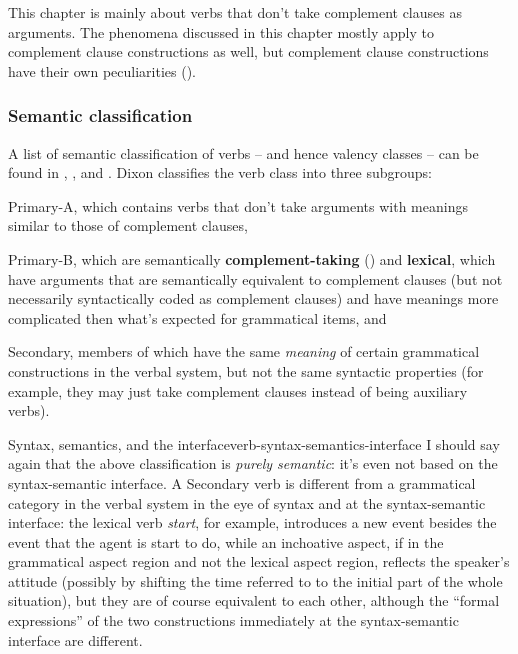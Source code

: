 \documentclass[a4paper, oneside]{report}
\newcommand*{\citesec}[1]{\S~{#1}}
\newcommand*{\concept}[1]{\textbf{#1}}
\newcommand{\corpus}[1]{\emph{#1}}
\begin{document}
This chapter is mainly about verbs that don't take complement clauses as arguments.
The phenomena discussed in this chapter mostly apply to complement clause constructions as well,
but complement clause constructions have their own peculiarities 
().

\subsubsection{Semantic classification}\label{sec:verb-valency.overview.semantic}

A list of semantic classification of verbs -- 
and hence valency classes -- can be found in 
\citet[Part B]{dixon2005semantic},
\citet[\citesec{18.5}]{dixon2010basic2},
and \citet[\citesec{3.3}]{dixon2009basic1}.
Dixon classifies the verb class into three subgroups:
\begin{enumerate*}
    \item Primary-A, which contains verbs that 
    don't take arguments with meanings similar to those of complement clauses,
    \item Primary-B, which are semantically \concept{complement-taking} () 
    and \concept{lexical},
    which have arguments that are semantically equivalent to complement clauses 
    (but not necessarily syntactically coded as complement clauses)
    and have meanings more complicated then what's expected for grammatical items, and 
    \item Secondary, members of which have the same \emph{meaning} 
    of certain grammatical constructions in the verbal system,
    but not the same syntactic properties
    (for example, they may just take complement clauses instead of being auxiliary verbs).
\end{enumerate*}

\begin{infobox}{Syntax, semantics, and the interface}{verb-syntax-semantics-interface}
    I should say again that the above classification is \emph{purely semantic}:
    it's even not based on the syntax-semantic interface. 
    A Secondary verb is different from a grammatical category in the verbal system
    in the eye of syntax 
    and at the syntax-semantic interface:
    the lexical verb \corpus{start}, for example, 
    introduces a new event besides the event that the agent is start to do, 
    while an inchoative aspect, 
    if in the grammatical aspect region and not the lexical aspect region,
    reflects the speaker's attitude
    (possibly by shifting the time referred to 
    to the initial part of the whole situation),
    but they are of course equivalent to each other,
    although the ``formal expressions'' of the two constructions 
    immediately at the syntax-semantic interface 
    are different.
\end{infobox}
\end{document}
